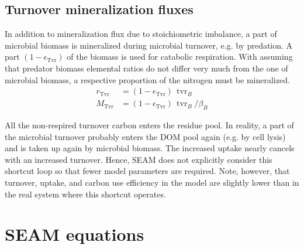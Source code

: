 \subsection{Turnover mineralization fluxes}
In addition to mineralization flux due to stoichiometric imbalance, a part of
microbial biomass is mineralized during microbial turnover, e.g. by predation. A
part $(1-\epsilon_{\operatorname{Tvr}})$ of the biomass is used for catabolic
respiration. With assuming that predator biomass elemental ratios do not differ
very much from the one of microbial biomass, a respective proportion of the
nitrogen must be mineralized.
\begin{subequations}
\label{eq:MinTvrB}
\begin{align} 
r_{\operatorname{Tvr}} &= (1-\epsilon_{\operatorname{Tvr}}) \,
\operatorname{tvr}_B
\\
M_{\operatorname{Tvr}} &= (1-\epsilon_{\operatorname{Tvr}}) \,
\operatorname{tvr}_{B} / \beta_B
\end{align}
\end{subequations}

All the non-respired turnover carbon enters the residue pool. In reality, a part
of the microbial turnover probably enters the DOM pool again (e.g. by cell
lysis) and is taken up again by microbial biomass. The increased uptake nearly
cancels with an increased turnover. Hence, SEAM does not explicitly consider this
shortcut loop so that fewer model parameters are required.
Note, however, that turnover, uptake, and carbon use efficiency in the model are
slightly lower than in the real system where this shortcut operates.


\section{\hspace*{-7mm}  SEAM equations \label{app:fAlphaFix}}    %


